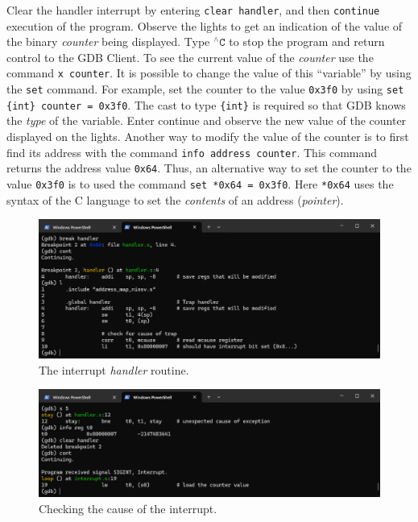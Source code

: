 \documentclass[11pt, twoside, pdftex]{article}
\newcommand{\red}[1]{{\color{red}\sf{#1}}}
\begin{document}
Clear the handler interrupt by entering \texttt{clear handler}, and then \texttt{continue}
execution of the program. Observe the \red{{\it LEDR}} lights to get an indication of the
value of the binary {\it counter} being displayed. Type $^{\wedge}\texttt{C}$ to stop the
program and return control to the GDB Client. To see the current value of the {\it counter}
use the command \texttt{x counter}. It is possible to change the value of this ``variable'' 
by using the \texttt{set} command. For example, set the counter to the value \texttt{0x3f0} by
using \texttt{set \{int\} counter = 0x3f0}. The cast to type \texttt{\{int\}} is required so that 
GDB knows the {\it type} of the variable. Enter continue and observe the new value of
the counter displayed on the \red{{\it LEDR}} lights. Another way to modify the value of
the counter is to first find its address with the command \texttt{info address counter}.
This command returns the address value \texttt{0x64}. Thus, an alternative way to set the 
counter to the value \texttt{0x3f0} is to used the command
\texttt{set *0x64 = 0x3f0}. Here \texttt{*0x64}
uses the syntax of the C language to set the {\it contents} of an address ({\it pointer}). 

\begin{figure}[h]
    \begin{center}
        \includegraphics[scale=.6]{figures/interrupt_s4.png}
        \caption{The interrupt {\it handler} routine.}
        \label{fig:interrupt_s4}
    \end{center}
\end{figure}

\begin{figure}[h]
    \begin{center}
        \includegraphics[scale=.6]{figures/interrupt_s5.png}
        \caption{Checking the cause of the interrupt.}
        \label{fig:interrupt_s5}
    \end{center}
\end{figure}
\end{document}
